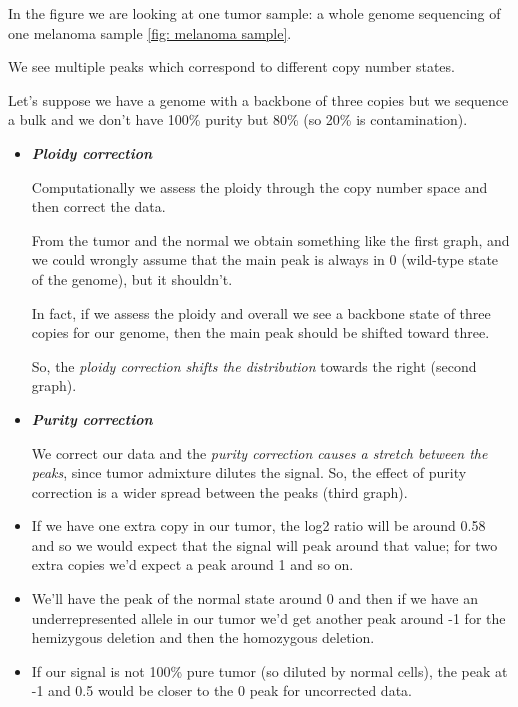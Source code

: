 In the figure we are looking at one tumor sample: a whole genome sequencing of
one melanoma sample \ref*{fig: melanoma sample}.

We see multiple peaks which correspond to different copy number states.

Let's suppose we have a genome with a backbone of three copies but we sequence a
bulk and we don't have 100\% purity but 80\% (so 20\% is contamination).

\begin{itemize}
  \item \emph{\textbf{Ploidy correction}}

  Computationally we assess the ploidy through the copy number space and then
  correct the data.
  
  From the tumor and the normal we obtain something like the first graph, and we
  could wrongly assume that the main peak is always in 0 (wild-type state of the
  genome), but it shouldn't.
  
  In fact, if we assess the ploidy and overall we see a backbone state of three
  copies for our genome, then the main peak should be shifted toward three.
  
  So, the \emph{ploidy correction shifts the distribution} towards the right
  (second graph).

  \item \emph{\textbf{Purity correction}}

  We correct our data and the \emph{{purity correction causes a stretch between
  the peaks}}, since tumor admixture dilutes the signal. So, the effect of purity
  correction is a wider spread between the peaks (third graph).
\end{itemize}

\begin{itemize}
\item
  If we have one extra copy in our tumor, the log2 ratio will be around 0.58 and
  so we would expect that the signal will peak around that value; for two extra
  copies we'd expect a peak around 1 and so on.
\item
  We'll have the peak of the normal state around 0 and then if we have an
  underrepresented allele in our tumor we'd get another peak around -1 for the
  hemizygous deletion and then the homozygous deletion.
\item
  If our signal is not 100\% pure tumor (so diluted by normal cells), the peak
  at -1 and 0.5 would be closer to the 0 peak for uncorrected data.
\end{itemize}

